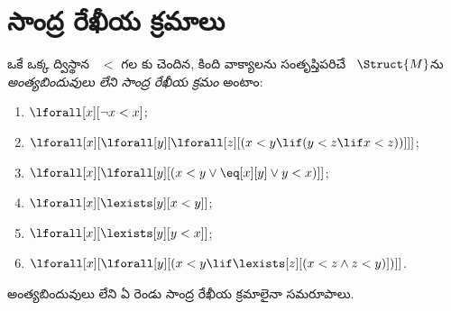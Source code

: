 \documentclass[../../../include/open-logic-section]{subfiles}
\begin{document}
\section{సాంద్ర రేఖీయ క్రమాలు}

\begin{defn}
  ఒకే ఒక్క ద్విస్థాన ~$<$ గల
  కు చెందిన, కింది వాక్యాలను సంతృప్తిపరిచే
  ~$\Struct{M}$ను
  \emph{అంత్యబిందువులు లేని సాంద్ర రేఖీయ క్రమం} అంటాం:
  \begin{enumerate}
  \item $\lforall[x][\lnot x < x]$;
  \item $\lforall[x][\lforall[y][\lforall[z][(x < y \lif (y < z \lif x
    <z ))]]]$;
  \item $\lforall[x][\lforall[y][(x< y \lor \eq[x][y] \lor y < x)]]$;
  \item $\lforall[x][\lexists[y][x < y]]$;
  \item $\lforall[x][\lexists[y][y < x]]$;
  \item $\lforall[x][\lforall[y][(x < y \lif \lexists[z][(x < z \land
        z < y)])]]$.
  \end{enumerate}
\end{defn}

\begin{thm}
  అంత్యబిందువులు లేని ఏ రెండు  సాంద్ర
  రేఖీయ క్రమాలైనా సమరూపాలు.
\end{thm}
\end{document}
